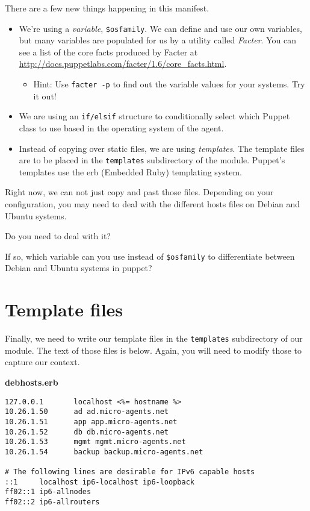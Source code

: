 \documentclass{article}   	%
\begin{document}

There are a few new things happening in this manifest.
\begin{itemize}
  \item We're using a \emph{variable}, \texttt{\$osfamily}.  We can define and use our own variables, but many variables are populated for us by a utility called \emph{Facter}.  You can see a list of the core facts produced by Facter at \\ 
  \url{http://docs.puppetlabs.com/facter/1.6/core_facts.html}.
  \begin{itemize}
  \item Hint: Use {\tt facter -p} to find out the variable values for your systems. Try it out!
  \end{itemize}
  \item We are using an \texttt{if/elsif} structure to conditionally select which Puppet class to use based in the operating system of the agent.
  \item Instead of copying over static files, we are using \emph{templates}.  The template files are to be placed in the \texttt{templates} subdirectory of the module.  Puppet's templates use the erb (Embedded Ruby) templating system.
\end{itemize}

Right now, we can not just copy and past those files. Depending on your configuration, you may need to deal with the different hosts files on Debian and Ubuntu systems.

Do you need to deal with it?

\vspace{0.5cm}

If so, which variable can you use instead of {\tt \$osfamily} to differentiate between Debian and Ubuntu systems in puppet?



\section{Template files}
Finally, we need to write our template files in the \texttt{templates} subdirectory of our module.  The text of those files is below. Again, you will need to modify those to capture our context.

\textbf{debhosts.erb}
\begin{verbatim}
127.0.0.1       localhost <%= hostname %>
10.26.1.50      ad ad.micro-agents.net
10.26.1.51      app app.micro-agents.net
10.26.1.52      db db.micro-agents.net
10.26.1.53      mgmt mgmt.micro-agents.net
10.26.1.54      backup backup.micro-agents.net

# The following lines are desirable for IPv6 capable hosts
::1     localhost ip6-localhost ip6-loopback
ff02::1 ip6-allnodes
ff02::2 ip6-allrouters
\end{verbatim}
\end{document}
